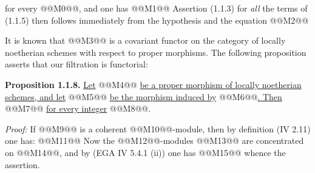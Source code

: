 
for every @@M0@@, and one has
@@M1@@
Assertion (1.1.3) for \emph{all} the terms of (1.1.5) then follows immediately from the hypothesis and the equation
@@M2@@

It is known that @@M3@@ is a covariant functor on the category of locally noetherian schemes with respect to proper morphisms. The following proposition asserts that our filtration is functorial:

\textbf{Proposition 1.1.8.} \uline{Let} @@M4@@ \uline{be a proper morphism of locally noetherian schemes, and let}
@@M5@@
\uline{be the morphism induced by} @@M6@@\uline{. Then}
@@M7@@
\uline{for every integer} @@M8@@.

\emph{Proof:} If @@M9@@ is a coherent @@M10@@-module, then by definition (IV 2.11) one has:
@@M11@@
Now the @@M12@@-modules @@M13@@ are concentrated on @@M14@@, and by (EGA IV 5.4.1 (ii)) one has
@@M15@@
whence the assertion.

